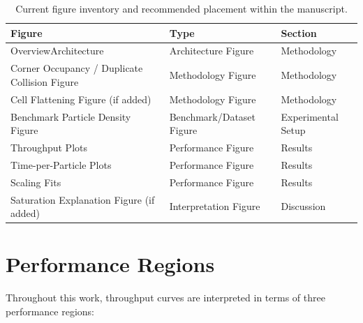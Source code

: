 \begin{table}[h!]
\centering
\caption{Current figure inventory and recommended placement within the manuscript.}
\label{tab:figure_inventory}
\begin{tabular}{p{4.0cm} p{3.5cm} p{3.5cm}}
\hline
\textbf{Figure} & \textbf{Type} & \textbf{Section} \\
\hline

OverviewArchitecture &
Architecture Figure &
Methodology \\

Corner Occupancy / Duplicate Collision Figure &
Methodology Figure &
Methodology \\

Cell Flattening Figure (if added) &
Methodology Figure &
Methodology \\

Benchmark Particle Density Figure &
Benchmark/Dataset Figure &
Experimental Setup \\

Throughput Plots &
Performance Figure &
Results \\

Time-per-Particle Plots &
Performance Figure &
Results \\

Scaling Fits &
Performance Figure &
Results \\

Saturation Explanation Figure (if added) &
Interpretation Figure &
Discussion \\

\hline
\end{tabular}
\end{table}

\section{Performance Regions}

Throughout this work, throughput curves are interpreted in terms of
three performance regions:

